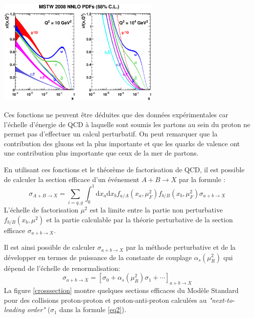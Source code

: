 \begin{minipagewithmarginpars}[ht!]{0.95\textwidth}
	\centering
	\includegraphics[width=0.6\textwidth]{LHC/pdf.eps}
	\captionsetup{type=figure}\caption{Produit de $x$ avec la  distribution de parton non-polarisée $f(x)$, où $f=u$, $\bar{u}$, $d$, $\bar{d}$, $c$, $\bar{c}$, $s$, $\bar{s}$, $b$, $\bar{b}$, $g$ et leurs incertitudes, en utilisant la paramétrisation NNLO MSTW2008 à l'échelle \SI{10}{\square\giga\eV} (gauche) et \SI{10000}{\square\giga\eV} (droite) \cite{Martin:2009iq}.}
	\label{pdf}	
\end{minipagewithmarginpars}
 
Ces fonctions ne peuvent être déduites que des données expérimentales car l'échelle d'énergie de QCD à laquelle sont soumis les partons au sein du proton ne permet pas d'effectuer un calcul perturbatif. On peut remarquer que la contribution des gluons est la plus importante et que les quarks de valence ont une contribution plus importante que ceux de la mer de partons.

En utilisant ces fonctions et le théorème de factorisation de QCD, il est possible de calculer la section efficace d'un événement $A+B\rightarrow X$ par la formule :
\begin{equation}
\sigma_{A+B\rightarrow X}=\sum_{i=q,g}\int_{0}^{1} \mathrm{d}x_{a}\mathrm{d}x_{b}f_{a/A}(x_{a},\mu_{F}^{2})f_{b/B}(x_{b},\mu_{F}^{2})\sigma{_{a+b\rightarrow X}}
\end{equation}
L'échelle de factorisation $\mu^{2}$ est la limite entre la partie non perturbative $f_{b/B}(x_{b},\mu^{2})$ et la partie calculable par la théorie perturbative de la section efficace $\sigma{_{a+b\rightarrow X}}$.

Il est ainsi possible de calculer $\sigma{_{a+b\rightarrow X}}$ par la méthode perturbative et de la développer en termes de puissance de la constante de couplage $\alpha_{s}\left(\mu_{R}^{2}\right)$ qui dépend de l'échelle de renormalisation:
\begin{equation}
\sigma_{a+b\rightarrow X}=\left[\sigma_{0}+\alpha_{s}\left(\mu_{R}^{2}\right)\sigma_{1}+\cdots\right]_{a+b\rightarrow X}
\label{eq2}
\end{equation}
La figure \ref{crosssection} montre quelques sections efficaces du Modèle Standard pour des collisions proton-proton et proton-anti-proton calculées au \textit{"next-to-leading order"} ($\sigma_{1}$ dans la formule \ref{eq2}).

